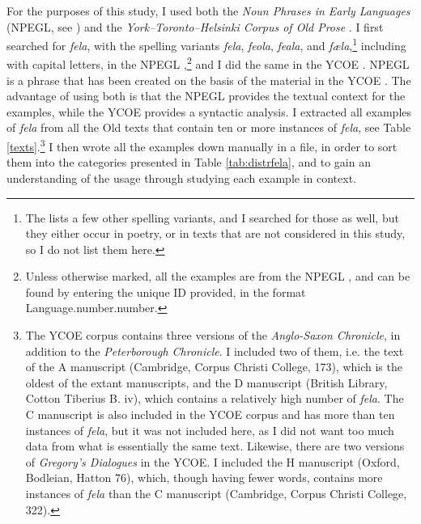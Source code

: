 \documentclass[output=paper,colorlinks,citecolor=brown]{langscibook}
\begin{document}
\begin{sloppypar}
For the purposes of this study, I used both the \textit{Noun Phrases in Early  Languages}  (NPEGL, see ) and the \textit{York--Toronto--Helsinki Corpus of Old  Prose} \citep[YCOE,][]{YCOE}. I first searched for \textit{fela}, with the spelling variants \textit{fela}, \textit{feola}, \textit{feala}, and \textit{fæla},\footnote{The \citet{DOE} lists a few other spelling variants, and I searched for those as well, but they either occur in poetry, or in texts that are not considered in this study, so I do not list them here.}  including with capital letters, in the NPEGL ,\footnote{Unless otherwise marked, all the examples are from the NPEGL , and can be found by entering the unique ID provided, in the format Language.number.number.} and I did the same in the YCOE . NPEGL is a  phrase  that has been created on the basis of the material in the YCOE . The advantage of using both is that the NPEGL  provides the textual context for the examples, while the YCOE provides a syntactic analysis. I extracted all examples of \textit{fela} from all the Old  texts that contain ten or more instances of \textit{fela}, see Table \ref{texts}.\footnote{The YCOE corpus contains three versions of the \textit{Anglo-Saxon Chronicle}, in addition to the \textit{Peterborough Chronicle}. I included two of them, i.e. the text of the A manuscript (Cambridge, Corpus Christi College, 173), which is the oldest of the extant manuscripts, and the D manuscript (British Library, Cotton Tiberius B. iv), which contains a relatively high number of \textit{fela}. The C manuscript is also included in the YCOE corpus and has more than ten instances of \textit{fela}, but it was not included here, as I did not want too much data from what is essentially the same text. Likewise, there are two versions of \textit{Gregory’s Dialogues} in the YCOE. I included the H manuscript (Oxford, Bodleian, Hatton 76), which, though having fewer words, contains more instances of \textit{fela} than the C manuscript (Cambridge, Corpus Christi College, 322).} I then wrote all the examples down manually in a file, in order to sort them into the categories presented in Table \ref{tab:distrfela}, and to gain an understanding of the usage through studying each example in context.\end{sloppypar}
\end{document}
